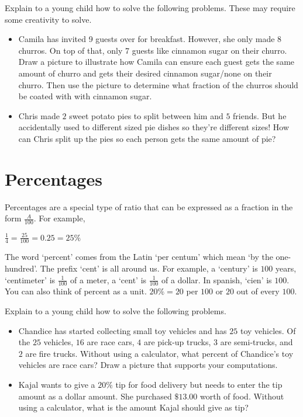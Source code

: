 \documentclass{ximera}
\begin{document}
\begin{exploration}
Explain to a young child how to solve the following problems. These may require some creativity to solve.
\begin{itemize}
\item Camila has invited 9 guests over for breakfast. However, she only made 8 churros. On top of that, only 7 guests like cinnamon sugar on their churro.  Draw a picture to illustrate how Camila can ensure each guest gets the same amount of churro and gets their desired cinnamon sugar/none on their churro. Then use the picture to determine what fraction of the churros should be coated with with cinnamon sugar.
\item Chris made $2$ sweet potato pies to split between him and $5$ friends. But he accidentally used to different sized pie dishes so they're different sizes! How can Chris split up the pies so each person gets the same amount of pie?
\end{itemize}
\end{exploration}

\section{Percentages}
Percentages are a special type of ratio that can be expressed as a fraction in the form $\frac{A}{100}$.  For example,
\begin{center} $\frac{1}{4} = \frac{25}{100} = 0.25=25\%$ \end{center}

The word `percent' comes from the Latin `per centum' which mean `by the one-hundred'. The prefix `cent' is all around us. For example, a `century' is $100$ years, `centimeter' is $\frac{1}{100}$ of a meter, a `cent' is $\frac{1}{100}$ of a dollar. In spanish, `cien' is $100$. You can also think of percent as a unit. $20\%= 20$ per $100$ or $20$ out of every $100$. \\



\begin{exploration}
Explain to a young child how to solve the following problems.
\begin{itemize} 
\item Chandice has started collecting small toy vehicles and has $25$ toy vehicles. Of the $25$ vehicles, $16$ are race cars, $4$ are pick-up trucks, $3$ are semi-trucks, and $2$ are fire trucks.  Without using a calculator, what percent of Chandice's toy vehicles are race cars? Draw a picture that supports your computations.
\item Kajal wants to give a $20\%$ tip for food delivery but needs to enter the tip amount as a dollar amount. She purchased $\$13.00$ worth of food. Without using a calculator, what is the amount Kajal should give as tip?
\end{itemize}
\end{exploration} 
\end{document}
